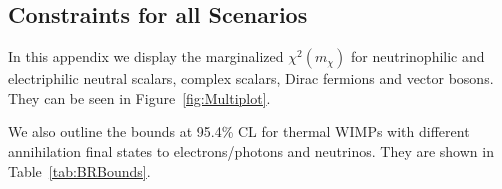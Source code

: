 \documentclass[notitlepage,letterpaper,natbib,aps,prd,onecolumn,amsmath,amsfonts,nofootinbib,preprintnumbers,superscriptaddress,secnumarabic,groupedaddress]{revtex4-1}
\begin{document}
\newpage
\subsection{Constraints for all Scenarios}
\label{app:FullResults}

In this appendix we display the marginalized $\chi^2(m_\chi)$ for neutrinophilic and electriphilic neutral scalars, complex scalars, Dirac fermions and vector bosons. They can be seen in Figure~\ref{fig:Multiplot}.

We also outline the bounds at 95.4\% CL for thermal WIMPs with different annihilation final states to electrons/photons and neutrinos. They are shown in Table~\ref{tab:BRBounds}.

\begin{figure}[t]
    \centering

\end{figure}
\end{document}
